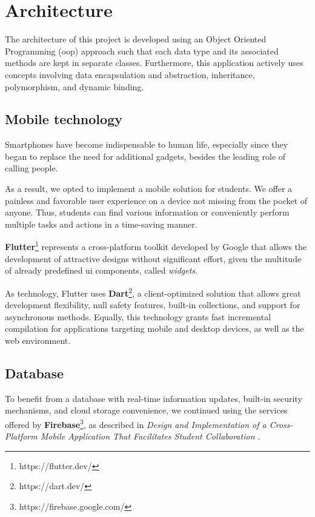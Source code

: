 \chapter{Architecture} \label{chapter5}

    The architecture of this project is developed using an Object Oriented Programming (\acrshort{oop}) approach such that each data type and its associated methods are kept in separate classes. Furthermore, this application actively uses concepts involving data encapsulation and abstraction, inheritance, polymorphism, and dynamic binding.

\section{Mobile technology} \label{5:mobile_technology}

    Smartphones have become indispensable to human life, especially since they began to replace the need for additional gadgets, besides the leading role of calling people.
    
    As a result, we opted to implement a mobile solution for students. We offer a painless and favorable user experience on a device not missing from the pocket of anyone. Thus, students can find various information or conveniently perform multiple tasks and actions in a time-saving manner.
    
    \textbf{Flutter}\footnote{https://flutter.dev/} represents a cross-platform toolkit developed by Google that allows the development of attractive designs without significant effort, given the multitude of already predefined \acrshort{ui} components, called \textit{widgets}.
    
    As technology, Flutter uses \textbf{Dart}\footnote{https://dart.dev/}, a client-optimized solution that allows great development flexibility, null safety features, built-in collections, and support for asynchronous methods. Equally, this technology grants fast incremental compilation for applications targeting mobile and desktop devices, as well as the web environment.

\section{Database} \label{5:database}

    To benefit from a database with real-time information updates, built-in security mechanisms, and cloud storage convenience, we continued using the services offered by \textbf{Firebase}\footnote{https://firebase.google.com/}, as described in \textit{Design and Implementation of a Cross-Platform Mobile Application That Facilitates Student Collaboration} \cite{ioana2020paper}.
    
